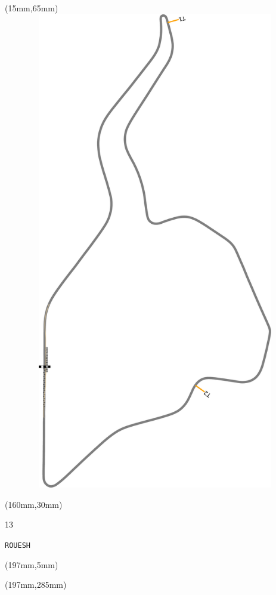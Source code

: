 \begin{textblock*}{185mm}(15mm,65mm)%
\centering
\mbox{\includegraphics[width=185mm,height=210mm,keepaspectratio]{PT/ROUESH.pdf}}
\end{textblock*}
\begin{textblock*}{40mm}(160mm,30mm)%
\Large
\par{} 
\par13 
\par\hfill\tiny\tt ROUESH\\
\end{textblock*}
\begin{textblock*}{20mm}(197mm,5mm)%
\fbox{\thepage}
\label{ROUESH}
\end{textblock*}
\begin{textblock*}{20mm}(197mm,285mm)%
\fbox{\thepage}
\end{textblock*}

